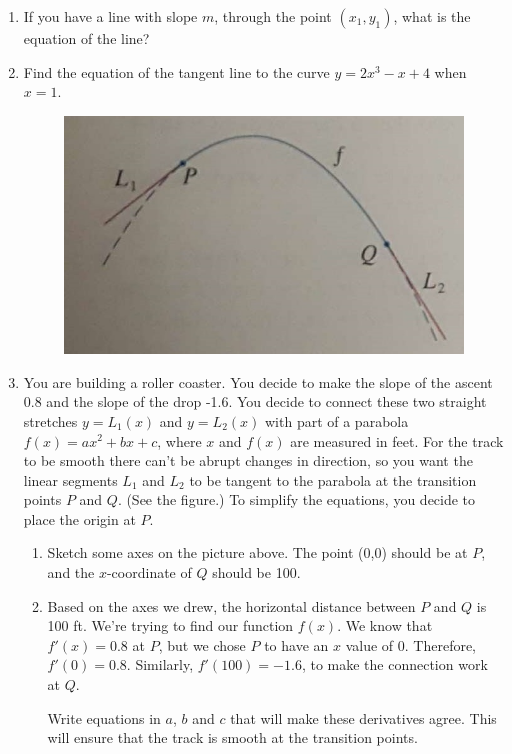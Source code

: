 \documentclass{article}
\begin{document}
\begin{enumerate}
\item If you have a line with slope $m$, through the point $(x_1,y_1)$, what is the equation of the line?
\item Find the equation of the tangent line to the curve $y = 2x^3 - x + 4$ when $x = 1$.
\begin{figure}[h]
\includegraphics[scale=.8]{roll.jpg}
\centering
\end{figure}
\item You are building a roller coaster. You decide to make the slope of the ascent 0.8 and the slope of the drop -1.6. You decide to connect these two straight stretches $ y = L_1(x) $ and $ y = L_2(x) $ with part of a parabola $f(x) = ax^2 + bx + c $, where $ x $ and $ f(x) $ are measured in feet. For the track to be smooth there can't be abrupt changes in direction, so you want the linear segments $ L_1 $ and $ L_2 $ to be tangent to the parabola at the transition points $ P $ and $ Q $. (See the figure.) To simplify the equations, you decide to place the origin at $ P $.

\begin{enumerate}[label=(\alph*)]
\itemsep0em
\item Sketch some axes on the picture above. The point (0,0) should be at $P$, and the $x$-coordinate of $Q$ should be 100.

\item Based on the axes we drew, the horizontal distance between $ P $ and $ Q $ is 100 ft. We're trying to find our function $f(x)$. We know that $f'(x) =0.8$ at $P$, but we chose $P$ to have an $x$ value of 0. Therefore, $f'(0) = 0.8.$ Similarly, $f'(100) = -1.6$, to make the connection work at $Q$.

Write equations in $ a $, $ b $ and $ c $ that will make these derivatives agree. This will ensure that the track is smooth at the transition points.


\end{enumerate}
\end{enumerate}
\end{document}

